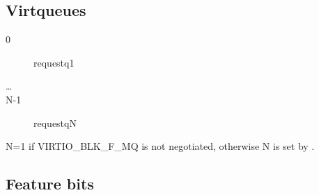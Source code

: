 \subsection{Virtqueues}\label{sec:Device Types / Block Device / Virtqueues}
\begin{description}
\item[0] requestq1
\item[\ldots]
\item[N-1] requestqN
\end{description}

 N=1 if VIRTIO_BLK_F_MQ is not negotiated, otherwise N is set by
 .

\subsection{Feature bits}\label{sec:Device Types / Block Device / Feature bits}

